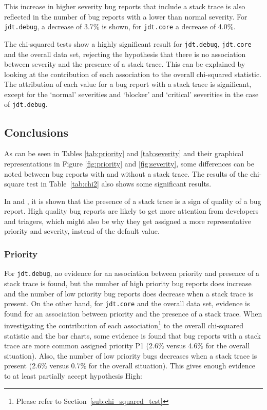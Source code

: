 This increase in higher severity bug reports that include a stack trace is also reflected in the number of bug reports with a lower than normal severity. For \texttt{jdt.debug}, a decrease of 3.7\% is shown, for \texttt{jdt.core} a decrease of 4.0\%.

The chi-squared tests show a highly significant result for \texttt{jdt.debug}, \texttt{jdt.core} and the overall data set, rejecting the hypothesis that there is no association between severity and the presence of a stack trace. This can be explained by looking at the contribution of each association to the overall chi-squared statistic. The attribution of each value for a bug report with a stack trace is significant, except for the `normal' severities and `blocker' and `critical' severities in the case of \texttt{jdt.debug}.

\subsection{Conclusions} %
As can be seen in Tables \ref{tab:priority} and \ref{tab:severity} and their graphical representations in Figure \ref{fig:priority} and \ref{fig:severity}, some differences can be noted between bug reports with and without a stack trace. The results of the chi-square test in Table~\ref{tab:chi2} also shows some significant results.

In \cite{Bettenburg2007} and \cite{Zimmermann2010}, it is shown that the presence of a stack trace is a sign of quality of a bug report. High quality bug reports are likely to get more attention from developers and triagers, which might also be why they get assigned a more representative priority and severity, instead of the default value.

\subsubsection{Priority} 
For \texttt{jdt.debug}, no evidence for an association between priority and presence of a stack trace is found, but the number of high priority bug reports does increase and the number of low priority bug reports does decrease when a stack trace is present. On the other hand, for \texttt{jdt.core} and the overall data set, evidence is found for an association between priority and the presence of a stack trace. When investigating the contribution of each association\footnote{Please refer to Section~\ref{sub:chi_squared_test}} to the overall chi-squared statistic and the bar charts, some evidence is found that bug reports with a stack trace are more common assigned priority P1 (2.6\% versus 4.6\% for the overall situation). Also, the number of low priority bugs decreases when a stack trace is present (2.6\% versus 0.7\% for the overall situation). This gives enough evidence to at least partially accept hypothesis High:

